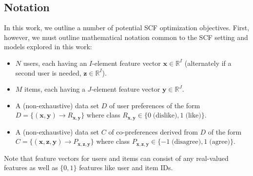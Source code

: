 \documentclass{sig-alternate}
\newcommand{\R}{\mathbb{R}}
\newcommand{\x}{\vec{x}}
\newcommand{\y}{\vec{y}}
\newcommand{\z}{\vec{z}}
\renewcommand{\vec}[1]{\mathbf{#1}}
\begin{document}
\subsection{Notation}

In this work, we outline a number of potential SCF optimization
objectives.  First, however, we must outline mathematical notation
common to the SCF setting and models explored in this work:
\begin{itemize}
\item $N$ users, each having an $I$-element feature vector 
$\x \in \R^I$ (alternately if a second user is needed, $\z \in \R^I$).
\item $M$ items, each having a $J$-element feature vector 
$\y \in \R^J$.
\item A (non-exhaustive) data set $D$ of user preferences of the form
$D = \{ (\x, \y) \to R_{\x,\y} \}$ where class 
$R_{\x,\y} \in \{ 0 \; \mbox{(dislike)}, 1 \; \mbox{(like)} \}$.
\item A (non-exhaustive) data set $C$ of co-preferences derived from $D$ of the form
$C = \{ (\x, \z, \y) \to P_{\x, \z, \y} \}$ where class 
$P_{\x, \z, \y} \in \{ -1 \; \mbox{(disagree)}, 1 \;\mbox{(agree)} \}$.  
\end{itemize}
Note that feature vectors for users 
and items can consist of any real-valued features as well as $\{0,1\}$
features like user and item IDs.
\end{document}
